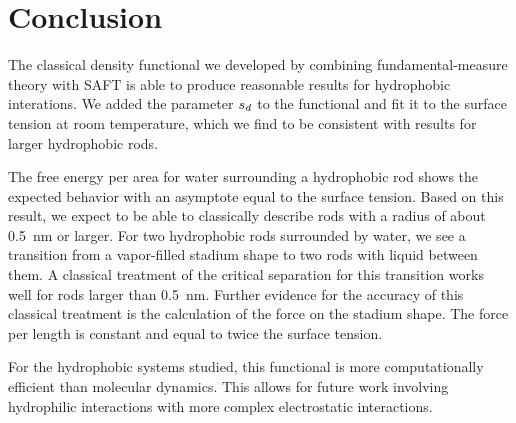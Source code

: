\documentclass[letterpaper,twocolumn,amsmath,amssymb,prb]{revtex4-1}
\begin{document}
\section{Conclusion}

The classical density functional we developed by combining fundamental-measure 
theory with SAFT is able to produce reasonable results for hydrophobic interations.
We added the parameter $s_d$ to the functional and fit it to the surface tension
at room temperature, which we find to be consistent with results for larger hydrophobic
rods. 

The free energy per area for water surrounding a hydrophobic rod shows the
expected behavior with an asymptote equal to the surface tension.
Based on this result, we expect to be
able to classically describe rods with a radius of about 0.5~nm or larger. 
For two hydrophobic rods surrounded by water, we see a transition from a vapor-filled
stadium shape to two rods with liquid between them. A
classical treatment of the critical separation for this transition
works well for rods larger than 0.5~nm. Further evidence for the
accuracy of this classical treatment is the calculation of the force on the
stadium shape. The force per length is constant and equal to twice the surface tension.

For the hydrophobic systems studied, this functional is more computationally 
efficient than molecular dynamics. This allows for future work
involving hydrophilic interactions with more complex electrostatic interactions.


\end{document}
